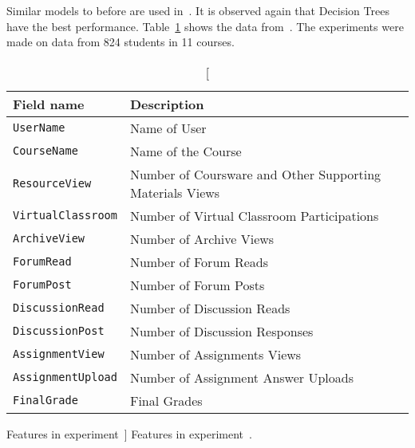 Similar models to before are used in~\cite{ind_005}. It is observed again that
Decision Trees have the best performance. Table~\ref{tab:ind_005_fields} shows
the data from~\cite{ind_005}. The experiments were made on data from 824
students in 11 courses.

\begin{table}[h!]
    \centering

    \begin{tabular}{l l}
        Field name                & Description                                              \\ \hline
        \texttt{UserName}         & Name of User                                             \\
        \texttt{CourseName}       & Name of the Course                                       \\
        \texttt{ResourceView}     & Number of Coursware and Other Supporting Materials Views \\
        \texttt{VirtualClassroom} & Number of Virtual Classroom Participations               \\
        \texttt{ArchiveView}      & Number of Archive Views                                  \\
        \texttt{ForumRead}        & Number of Forum Reads                                    \\
        \texttt{ForumPost}        & Number of Forum Posts                                    \\
        \texttt{DiscussionRead}   & Number of Discussion Reads                               \\
        \texttt{DiscussionPost}   & Number of Discussion Responses                           \\
        \texttt{AssignmentView}   & Number of Assignments Views                              \\
        \texttt{AssignmentUpload} & Number of Assignment Answer Uploads                      \\
        \texttt{FinalGrade}       & Final Grades                                             \\
    \end{tabular}

    \caption
        [Features in experiment~\cite{ind_005}]
        {Features in experiment~\cite{ind_005}.}

    \label{tab:ind_005_fields}
\end{table}

